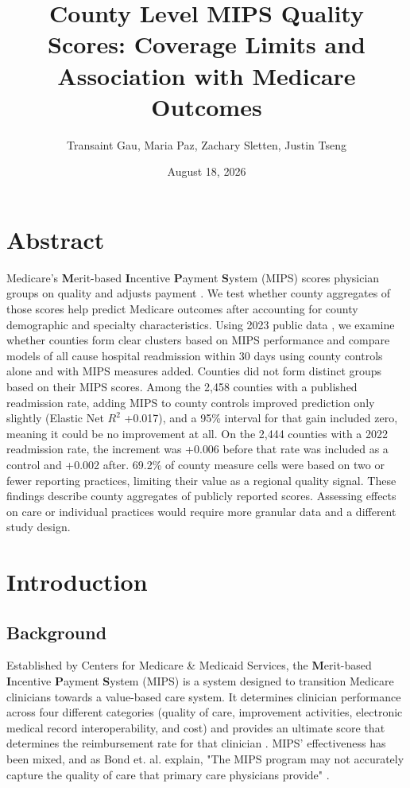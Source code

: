 \documentclass[12pt]{article}
\title{County Level MIPS Quality Scores: Coverage Limits and Association with Medicare Outcomes}
\author{Transaint Gau, Maria Paz, Zachary Sletten, Justin Tseng}
\date{August 18, 2026}
\begin{document}
\maketitle

\section{Abstract}
Medicare's \textbf{M}erit-based \textbf{I}ncentive \textbf{P}ayment \textbf{S}ystem (MIPS) scores physician groups on quality and adjusts payment \cite{Lin2025Merit-BasedYears}. We test whether county aggregates of those scores help predict Medicare outcomes after accounting for county demographic and specialty characteristics. Using 2023 public data \cite{2023PYAttestations, 2026MedicareCounty, 2023DoctorsFile}, we examine whether counties form clear clusters based on MIPS performance and compare models of all cause hospital readmission within 30 days using county controls alone and with MIPS measures added. Counties did not form distinct groups based on their MIPS scores. Among the 2,458 counties with a published readmission rate, adding MIPS to county controls improved prediction only slightly (Elastic Net $R^2$ +0.017), and a 95\% interval for that gain included zero, meaning it could be no improvement at all. On the 2,444 counties with a 2022 readmission rate, the increment was +0.006 before that rate was included as a control and +0.002 after. 69.2\% of county measure cells were based on two or fewer reporting practices, limiting their value as a regional quality signal. These findings describe county aggregates of publicly reported scores. Assessing effects on care or individual practices would require more granular data and a different study design.

\section{Introduction}

\subsection{Background}
Established by Centers for Medicare \& Medicaid Services, the \textbf{M}erit-based \textbf{I}ncentive \textbf{P}ayment \textbf{S}ystem (MIPS) is a system designed to transition Medicare clinicians towards a value-based care system. It determines clinician performance across four different categories (quality of care, improvement activities, electronic medical record interoperability, and cost) and provides an ultimate score that determines the reimbursement rate for that clinician \cite{Lin2025Merit-BasedYears}. MIPS' effectiveness has been mixed, and as Bond et. al. explain, "The MIPS program may not accurately capture the quality of care that primary care physicians provide" \cite{Bond2022AssociationOutcomes}.
\end{document}
